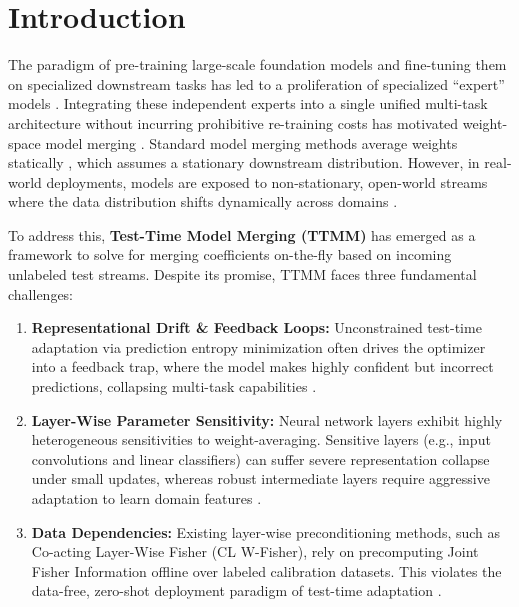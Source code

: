 \documentclass{article}
\theoremstyle{plain}
\theoremstyle{definition}
\theoremstyle{remark}
\begin{document}
\section{Introduction}
\label{sec:intro}
The paradigm of pre-training large-scale foundation models and fine-tuning them on specialized downstream tasks has led to a proliferation of specialized ``expert'' models \citep{wortsman2022robust, radford2021learning}. Integrating these independent experts into a single unified multi-task architecture without incurring prohibitive re-training costs has motivated weight-space model merging \citep{ilharco2022editing, matena2022merging}. Standard model merging methods average weights statically \citep{choshen2022fusing, anya2025merging}, which assumes a stationary downstream distribution. However, in real-world deployments, models are exposed to non-stationary, open-world streams where the data distribution shifts dynamically across domains \citep{yang2024adamerging, yang2025testtime}.

To address this, \textbf{Test-Time Model Merging (TTMM)} has emerged as a framework to solve for merging coefficients on-the-fly based on incoming unlabeled test streams. Despite its promise, TTMM faces three fundamental challenges:
\begin{enumerate}
    \item \textbf{Representational Drift \& Feedback Loops:} Unconstrained test-time adaptation via prediction entropy minimization often drives the optimizer into a feedback trap, where the model makes highly confident but incorrect predictions, collapsing multi-task capabilities \citep{yang2025testtime, wang2021tent}.
    \item \textbf{Layer-Wise Parameter Sensitivity:} Neural network layers exhibit highly heterogeneous sensitivities to weight-averaging. Sensitive layers (e.g., input convolutions and linear classifiers) can suffer severe representation collapse under small updates, whereas robust intermediate layers require aggressive adaptation to learn domain features \citep{he2024ktfisher}.
    \item \textbf{Data Dependencies:} Existing layer-wise preconditioning methods, such as Co-acting Layer-Wise Fisher (CL W-Fisher), rely on precomputing Joint Fisher Information offline over labeled calibration datasets. This violates the data-free, zero-shot deployment paradigm of test-time adaptation \citep{yang2025testtime}.
\end{enumerate}
\end{document}
